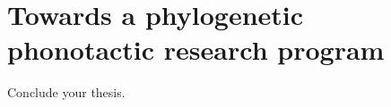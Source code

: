 \chapter[Towards phylogenetic phonotactics]{Towards a phylogenetic phonotactic research program}
\label{Chap:Discussion}

Conclude your thesis.

